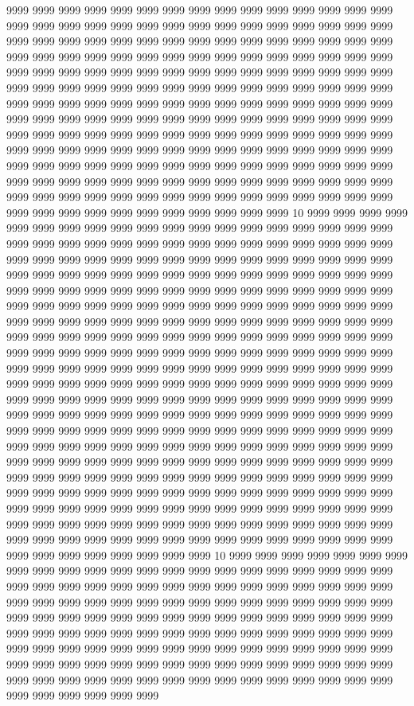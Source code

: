 9999 9999 9999 9999 9999 9999 9999 9999 9999 9999 9999 9999 9999 9999 9999 9999 9999 9999 9999 9999 9999 9999 9999 9999 9999 9999 9999 9999 9999 9999 9999 9999 9999 9999 9999 9999 9999 9999 9999 9999 9999 9999 9999 9999 9999 9999 9999 9999 9999 9999 9999 9999 9999 9999 9999 9999 9999 9999 9999 9999 9999 9999 9999 9999 9999 9999 9999 9999 9999 9999 9999 9999 9999 9999 9999 9999 9999 9999 9999 9999 9999 9999 9999 9999 9999 9999 9999 9999 9999 9999 9999 9999 9999 9999 9999 9999 9999 9999 9999 9999 9999 9999 9999 9999 9999 9999 9999 9999 9999 9999 9999 9999 9999 9999 9999 9999 9999 9999 9999 9999 9999 9999 9999 9999 9999 9999 9999 9999 9999 9999 9999 9999 9999 9999 9999 9999 9999 9999 9999 9999 9999 9999 9999 9999 9999 9999 9999 9999 9999 9999 9999 9999 9999 9999 9999 9999 9999 9999 9999 9999 9999 9999 9999 9999 9999 9999 9999 9999 9999 9999 9999 9999 9999 9999 9999 9999 9999 9999 9999 9999 9999 9999 9999 9999 9999 9999 9999 9999 9999 9999 9999 9999 9999 9999 9999 9999 9999 9999 9999 9999 9999 9999 9999 9999 9999 9999 10 9999 9999 9999 9999 9999 9999 9999 9999 9999 9999 9999 9999 9999 9999 9999 9999 9999 9999 9999 9999 9999 9999 9999 9999 9999 9999 9999 9999 9999 9999 9999 9999 9999 9999 9999 9999 9999 9999 9999 9999 9999 9999 9999 9999 9999 9999 9999 9999 9999 9999 9999 9999 9999 9999 9999 9999 9999 9999 9999 9999 9999 9999 9999 9999 9999 9999 9999 9999 9999 9999 9999 9999 9999 9999 9999 9999 9999 9999 9999 9999 9999 9999 9999 9999 9999 9999 9999 9999 9999 9999 9999 9999 9999 9999 9999 9999 9999 9999 9999 9999 9999 9999 9999 9999 9999 9999 9999 9999 9999 9999 9999 9999 9999 9999 9999 9999 9999 9999 9999 9999 9999 9999 9999 9999 9999 9999 9999 9999 9999 9999 9999 9999 9999 9999 9999 9999 9999 9999 9999 9999 9999 9999 9999 9999 9999 9999 9999 9999 9999 9999 9999 9999 9999 9999 9999 9999 9999 9999 9999 9999 9999 9999 9999 9999 9999 9999 9999 9999 9999 9999 9999 9999 9999 9999 9999 9999 9999 9999 9999 9999 9999 9999 9999 9999 9999 9999 9999 9999 9999 9999 9999 9999 9999 9999 9999 9999 9999 9999 9999 9999 9999 9999 9999 9999 9999 9999 9999 9999 9999 9999 9999 9999 9999 9999 9999 9999 9999 9999 9999 9999 9999 9999 9999 9999 9999 9999 9999 9999 9999 9999 9999 9999 9999 9999 9999 9999 9999 9999 9999 9999 9999 9999 9999 9999 9999 9999 9999 9999 9999 9999 9999 9999 9999 9999 9999 9999 9999 9999 9999 9999 9999 9999 9999 9999 9999 9999 9999 9999 9999 9999 9999 9999 9999 9999 9999 9999 9999 9999 9999 9999 9999 9999 9999 9999 9999 9999 9999 9999 9999 9999 9999 9999 9999 9999 9999 9999 9999 9999 9999 9999 9999 9999 9999 9999 9999 9999 9999 9999 9999 9999 9999 9999 9999 9999 9999 9999 9999 9999 9999 9999 9999 9999 9999 9999 9999 9999 9999 10 9999 9999 9999 9999 9999 9999 9999 9999 9999 9999 9999 9999 9999 9999 9999 9999 9999 9999 9999 9999 9999 9999 9999 9999 9999 9999 9999 9999 9999 9999 9999 9999 9999 9999 9999 9999 9999 9999 9999 9999 9999 9999 9999 9999 9999 9999 9999 9999 9999 9999 9999 9999 9999 9999 9999 9999 9999 9999 9999 9999 9999 9999 9999 9999 9999 9999 9999 9999 9999 9999 9999 9999 9999 9999 9999 9999 9999 9999 9999 9999 9999 9999 9999 9999 9999 9999 9999 9999 9999 9999 9999 9999 9999 9999 9999 9999 9999 9999 9999 9999 9999 9999 9999 9999 9999 9999 9999 9999 9999 9999 9999 9999 9999 9999 9999 9999 9999 9999 9999 9999 9999 9999 9999 9999 9999 9999 9999 9999 9999 9999 9999 9999 9999 